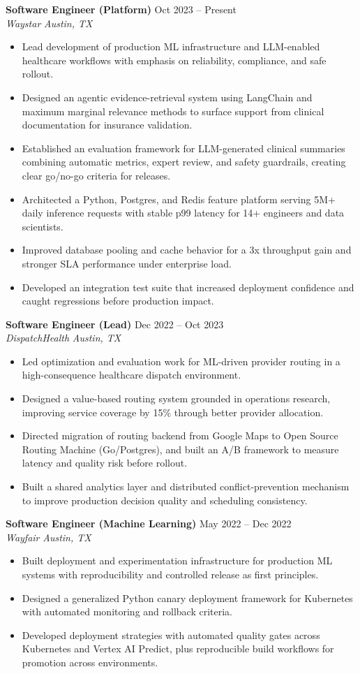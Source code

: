 \documentclass[10pt,letterpaper]{article}
\newenvironment{tightitemize}{%
  \begin{itemize}
    \setlength{\itemsep}{2pt}
    \setlength{\topsep}{2pt}
    \setlength{\parsep}{0pt}
    \setlength{\partopsep}{0pt}
}{%
  \end{itemize}
}
\newcommand{\roleheading}[4]{%
  \textbf{#1} \hfill #2\\
  \textit{#3} \hfill \textit{#4}\par
  \vspace{0.15em}
}
\begin{document}
\roleheading{Software Engineer (Platform)}{Oct 2023 -- Present}{Waystar}{Austin, TX}
\begin{tightitemize}
  \item Lead development of production ML infrastructure and LLM-enabled healthcare workflows with emphasis on reliability, compliance, and safe rollout.
  \item Designed an agentic evidence-retrieval system using LangChain and maximum marginal relevance methods to surface support from clinical documentation for insurance validation.
  \item Established an evaluation framework for LLM-generated clinical summaries combining automatic metrics, expert review, and safety guardrails, creating clear go/no-go criteria for releases.
  \item Architected a Python, Postgres, and Redis feature platform serving 5M+ daily inference requests with stable p99 latency for 14+ engineers and data scientists.
  \item Improved database pooling and cache behavior for a 3x throughput gain and stronger SLA performance under enterprise load.
  \item Developed an integration test suite that increased deployment confidence and caught regressions before production impact.
\end{tightitemize}

\roleheading{Software Engineer (Lead)}{Dec 2022 -- Oct 2023}{DispatchHealth}{Austin, TX}
\begin{tightitemize}
  \item Led optimization and evaluation work for ML-driven provider routing in a high-consequence healthcare dispatch environment.
  \item Designed a value-based routing system grounded in operations research, improving service coverage by 15\% through better provider allocation.
  \item Directed migration of routing backend from Google Maps to Open Source Routing Machine (Go/Postgres), and built an A/B framework to measure latency and quality risk before rollout.
  \item Built a shared analytics layer and distributed conflict-prevention mechanism to improve production decision quality and scheduling consistency.
\end{tightitemize}

\roleheading{Software Engineer (Machine Learning)}{May 2022 -- Dec 2022}{Wayfair}{Austin, TX}
\begin{tightitemize}
  \item Built deployment and experimentation infrastructure for production ML systems with reproducibility and controlled release as first principles.
  \item Designed a generalized Python canary deployment framework for Kubernetes with automated monitoring and rollback criteria.
  \item Developed deployment strategies with automated quality gates across Kubernetes and Vertex AI Predict, plus reproducible build workflows for promotion across environments.
\end{tightitemize}
\end{document}
